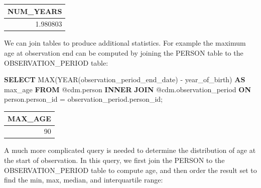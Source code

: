 \documentclass[]{book}
\newenvironment{Shaded}{\begin{snugshade}}{\end{snugshade}}
\newcommand{\KeywordTok}[1]{\textcolor[rgb]{0.13,0.29,0.53}{\textbf{#1}}}
\newcommand{\DataTypeTok}[1]{\textcolor[rgb]{0.13,0.29,0.53}{#1}}
\newcommand{\FunctionTok}[1]{\textcolor[rgb]{0.00,0.00,0.00}{#1}}
\newcommand{\NormalTok}[1]{#1}
\begin{document}
\begin{longtable}[]{@{}r@{}}
\toprule
NUM\_YEARS\tabularnewline
\midrule
\endhead
1.980803\tabularnewline
\bottomrule
\end{longtable}

We can join tables to produce additional statistics. For example the
maximum age at observation end can be computed by joining the PERSON
table to the OBSERVATION\_PERIOD table:

\begin{Shaded}
\begin{Highlighting}[]
\KeywordTok{SELECT} \FunctionTok{MAX}\NormalTok{(}\DataTypeTok{YEAR}\NormalTok{(observation_period_end_date) -}
\NormalTok{           year_of_birth) }\KeywordTok{AS}\NormalTok{ max_age}
\KeywordTok{FROM}\NormalTok{ @cdm.person}
\KeywordTok{INNER} \KeywordTok{JOIN}\NormalTok{ @cdm.observation_period}
  \KeywordTok{ON}\NormalTok{ person.person_id = observation_period.person_id;}
\end{Highlighting}
\end{Shaded}

\begin{longtable}[]{@{}r@{}}
\toprule
MAX\_AGE\tabularnewline
\midrule
\endhead
90\tabularnewline
\bottomrule
\end{longtable}

A much more complicated query is needed to determine the distribution of
age at the start of observation. In this query, we first join the PERSON
to the OBSERVATION\_PERIOD table to compute age, and then order the
result set to find the min, max, median, and interquartile range:
\end{document}
